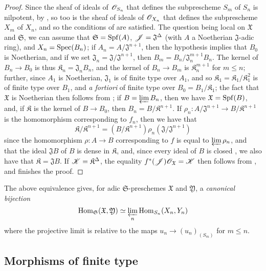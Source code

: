 \begin{proof}
\label{proof-1.10.12.3.1}
Since the sheaf of ideals of $\mathscr{O}_{S_n}$ that defines the subprescheme $S_m$ of $S_n$ is nilpotent, by , so too is the sheaf of ideals of $\mathscr{O}_{X_n}$ that defines the subprescheme $X_m$ of $X_n$, and so the conditions of  are satisfied.
The question being local on $\mathfrak{X}$ and $\mathfrak{S}$, we can assume that $\mathfrak{S}=\operatorname{Spf}(A)$, $\mathscr{J}=\mathfrak{J}^\Delta$ (with $A$ a Noetherian $\mathfrak{J}$-adic ring), and $X_n=\operatorname{Spec}(B_n)$;
if $A_n=A/\mathfrak{J}^{n+1}$, then the hypothesis implies that $B_0$ is Noetherian, and if we set $\mathfrak{J}_n=\mathfrak{J}/\mathfrak{J}^{n+1}$, then $B_m=B_n/\mathfrak{J}_n^{m+1}B_n$.
The kernel of $B_n\to B_0$ is thus $\mathfrak{K}_n=\mathfrak{J}_nB_n$, and the kernel of $B_n\to B_m$ is $\mathfrak{K}_n^{m+1}$ for $m\leq n$;
further, since $A_1$ is Noetherian, $\mathfrak{J}_1$ is of finite type over $A_1$, and so $\mathfrak{K}_1=\mathfrak{K}_1/\mathfrak{K}_1^2$ is of finite type over $B_1$, and \emph{a fortiori} of finite type over $B_0=B_1/\mathfrak{K}_1$;
the fact that $\mathfrak{X}$ is Noetherian then follows from ;
if $B=\varprojlim B_n$, then we have $\mathfrak{X}=\operatorname{Spf}(B)$, and, if $\mathfrak{K}$ is the kernel of $B\to B_0$, then $B_n=B/\mathfrak{K}^{n+1}$.
If $\rho_n:A/\mathfrak{J}^{n+1}\to B/\mathfrak{K}^{n+1}$ is the homomorphism corresponding to $f_n$, then we have that
\[
    \mathfrak{K}/\mathfrak{K}^{n+1} = (B/\mathfrak{K}^{n+1})\rho_n(\mathfrak{J}/\mathfrak{J}^{n+1})
\]
since the homomorphism $\rho:A\to B$ corresponding to $f$ is equal to $\varprojlim\rho_n$, and that the ideal $\mathfrak{J}B$ of $B$ is dense in $\mathfrak{K}$, and, since every ideal of $B$ is closed , we also have that $\mathfrak{K}=\mathfrak{J}B$.
If $\mathscr{K}=\mathfrak{K}^\Delta$, the equality $f^*(\mathscr{J})\mathscr{O}_\mathfrak{X}=\mathscr{K}$ then follows from , and finishes the proof.
\end{proof}

\begin{env}[10.12.3.2]
\label{1.10.12.3.2}
The above equivalence gives, for adic $\mathfrak{S}$-preschemes $\mathfrak{X}$ and $\mathfrak{Y}$, a \emph{canonical bijection}
\[
  \operatorname{Hom}_\mathfrak{S}(\mathfrak{X},\mathfrak{Y})\simeq\varprojlim_n\operatorname{Hom}_{S_n}(X_n,Y_n)
\]
where the projective limit is relative to the maps $u_n\to(u_n)_{(S_m)}$ for $m\leq n$.
\end{env}

\subsection{Morphisms of finite type}
\label{subsection:1.10.13}

